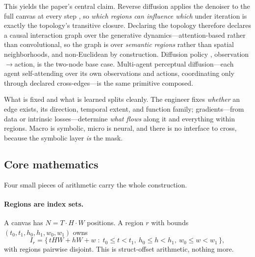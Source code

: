 \documentclass[10pt,twocolumn]{article}
\begin{document}
This yields the paper's central claim. Reverse diffusion applies the denoiser to the full canvas at every step \cite{ho2020ddpm,song2021score}, so \emph{which regions can influence which} under iteration is exactly the topology's transitive closure. Declaring the topology therefore declares a causal interaction graph over the generative dynamics---attention-based rather than convolutional, so the graph is over \emph{semantic regions} rather than spatial neighborhoods, and non-Euclidean by construction. Diffusion policy \cite{chi2023diffusion}, observation$\rightarrow$action, is the two-node base case. Multi-agent perceptual diffusion---each agent self-attending over its own observations and actions, coordinating only through declared cross-edges---is the same primitive composed.

What is fixed and what is learned splits cleanly. The engineer fixes \emph{whether} an edge exists, its direction, temporal extent, and function family; gradients---from data or intrinsic losses---determine \emph{what flows} along it and everything within regions. Macro is symbolic, micro is neural, and there is no interface to cross, because the symbolic layer \emph{is} the mask.

\subsection{Core mathematics}
\label{sec:math}
Four small pieces of arithmetic carry the whole construction.

\paragraph{Regions are index sets.} A canvas has $N = T\!\cdot\!H\!\cdot\!W$ positions. A region $r$ with bounds $(t_0,t_1,h_0,h_1,w_0,w_1)$ owns
\[
I_r=\{\,tHW{+}hW{+}w \;:\; t_0{\le}t{<}t_1,\ h_0{\le}h{<}h_1,\ w_0{\le}w{<}w_1\,\},
\]
with regions pairwise disjoint. This is struct-offset arithmetic, nothing more.
\end{document}
